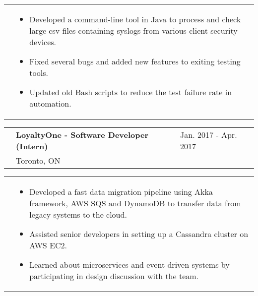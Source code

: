 \documentclass[letter, 10.5pt]{article}
\newcommand\bulletspacing{-0.15cm}
\newcommand\firstcolwidth{2.5cm}
\newcommand\listwidth{0.809\textwidth}
\begin{document}
    \begin{tabularx}{\textwidth}{@{}p{\firstcolwidth}X}
        & 
        \begin{minipage}[t]{\listwidth}
            \begin{itemize}
                \vspace{-0.3cm}
                \item Developed a command-line tool in Java to process and check large csv files containing syslogs from various client security devices.
                \vspace{\bulletspacing}
                \item Fixed several bugs and added new features to exiting testing tools.
                \vspace{\bulletspacing}
                \item Updated old Bash scripts to reduce the test failure rate in automation.
            \end{itemize}
        \end{minipage} \\
    \end{tabularx}
    \newline
    \vspace{1.9cm}
    \newline
    \begin{tabularx}{\textwidth}{@{}p{\firstcolwidth}Xl}
        & \textbf{LoyaltyOne - Software Developer (Intern)} & Jan. 2017 - Apr. 2017 \\
        & Toronto, ON & \\
    \end{tabularx}
    \newline
    \begin{tabularx}{\textwidth}{@{}p{\firstcolwidth}X}
        & 
        \begin{minipage}[t]{\listwidth}
            \begin{itemize}
                \vspace{-0.3cm}
                \item Developed a fast data migration pipeline using Akka framework, AWS SQS and DynamoDB to transfer data from legacy systems to the cloud.
                \vspace{\bulletspacing}
                \item Assisted senior developers in setting up a Cassandra cluster on AWS EC2.
                \vspace{\bulletspacing}
                \item Learned about microservices and event-driven systems by participating in design discussion with the team.
            \end{itemize}
        \end{minipage} \\
    \end{tabularx}
\end{document}

